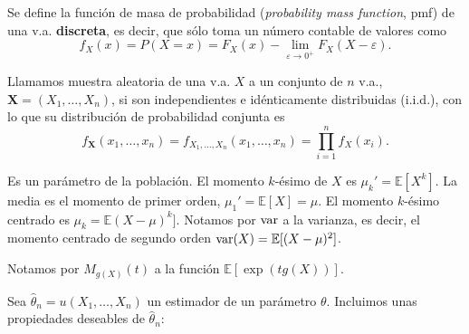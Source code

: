 \begin{definicion}
	Se define la función de masa de probabilidad  
(\textit{probability mass function}, pmf) de una v.a. 
\textbf{discreta}, es decir, que sólo toma un número contable 
de valores como
	\[ 
		f_X(x) = P(X=x) = 
		F_X(x) - 
			\lim_{\varepsilon \rightarrow 0^+} 
				F_X(X-\varepsilon).
	\]
\end{definicion}

\begin{definicion}
	Llamamos muestra aleatoria de una v.a. $X$ a un conjunto 
de $n$ v.a., $\mathbf{X} = (X_1, \dots, X_n)$, si son independientes e 
idénticamente distribuidas (i.i.d.), con lo que su 
distribución de probabilidad conjunta es
	\[ 
		f_{\mathbf{X}}(x_1, \dots, x_n) =
		f_{X_1, \dots, X_n}(x_1, \dots, x_n) =
		\prod\limits_{i=1}^n f_X(x_i).
	\]
\end{definicion}
	
\begin{definicion}[Momento]
	Es un parámetro de la población. El momento $k$-ésimo de 
$X$ es $\mu_k' = \mathbb{E}[X^k]$. La media es el momento de 
primer orden, $\mu_1' = \mathbb{E}[X] = \mu$. El momento 
$k$-ésimo centrado es  $\mu_k = \mathbb{E}(X - \mu)^k]$.
Notamos por $\text{var}$ a la varianza, es decir, el momento 
centrado de segundo orden $\text{var}(X) = \mathbb{E}[(X - \mu)^2]$. 
\end{definicion}

\begin{definicion}
	Notamos por $M_{g(X)}(t)$ a la función $\mathbb{E}[
\exp(tg(X))]$. 
\end{definicion}

	Sea $\hat{\theta}_n = u(X_1, \dots, X_n)$ un estimador de 
un parámetro $\theta$. Incluimos unas propiedades deseables 
de $\hat{\theta}_n$:
	
